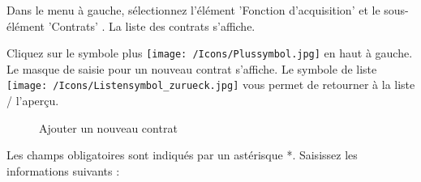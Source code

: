 Dans le menu à gauche, sélectionnez l'élément 'Fonction d'acquisition' et le sous-élément 'Contrats' . La liste des contrats s'affiche.

\vspace{\baselineskip}

Cliquez sur le symbole plus \texttt{[image: /Icons/Plussymbol.jpg]}  en haut à gauche. Le masque de saisie pour un nouveau contrat s'affiche. Le symbole de liste \texttt{[image: /Icons/Listensymbol\_zurueck.jpg]}  vous permet de retourner à la liste / l'aperçu.

\begin{figure}[H]
\caption{Ajouter un nouveau contrat}
\end{figure}

Les champs obligatoires sont indiqués par un astérisque *. Saisissez les informations suivants :

\vspace{\baselineskip}

